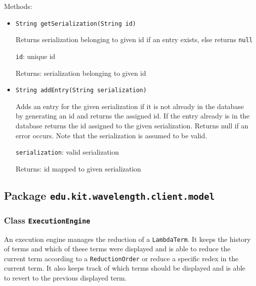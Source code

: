 Methods:
\begin{itemize}
\item \texttt{String getSerialization(String id)}

Returns serialization belonging to given id if an entry exists, else returns
 \texttt{null}

\texttt{id}: unique id

Returns: serialization belonging to given id

\item \texttt{String addEntry(String serialization)}

Adds an entry for the given serialization if it is not already in the
 database by generating an id and returns the assigned id. If the entry
 already is in the database returns the id assigned to the given
 serialization. Returns null if an error occurs. Note that the serialization
 is assumed to be valid.

\texttt{serialization}: valid serialization

Returns: id mapped to given serialization

\end{itemize}

\subsection{Package \lstinline{edu.kit.wavelength.client.model}}
\label{pkg:edu.kit.wavelength.client.model}


\subsubsection{Class \texttt{ExecutionEngine}}
\label{type:edu.kit.wavelength.client.model.ExecutionEngine}
An execution engine manages the reduction of a \texttt{LambdaTerm}. It keeps
 the history of terms and which of these terms were displayed and is able to
 reduce the current term according to a \texttt{ReductionOrder} or reduce a
 specific redex in the current term. It also keeps track of which terms should
 be displayed and is able to revert to the previous displayed term.

